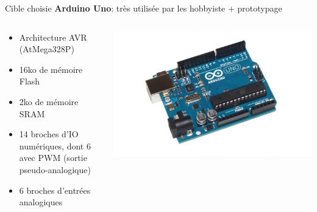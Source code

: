 \documentclass[xcolor={svgnames}]{beamer}
\begin{document}
\begin{frame}{Cible choisie}
  \textbf{Arduino Uno}: très utilisée par les hobbyiste + prototypage
  \begin{columns}[T]
    \begin{column}{.65\textwidth}
      \begin{itemize}
      \item Architecture AVR (AtMega328P)
      \item 16ko de mémoire Flash
      \item 2ko de mémoire SRAM
      \item 14 broches d'IO numériques, dont 6 avec PWM (sortie pseudo-analogique)
      \item 6 broches d'entrées analogiques
      \end{itemize}
    \end{column}
    \begin{column}{.46\textwidth}
      \vspace{0.5cm}
      \includegraphics[width=.35\paperwidth]{assets/uno.jpg}
    \end{column}
  \end{columns}
\end{frame}
\end{document}
